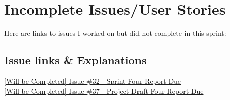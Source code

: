 \documentclass{article}
\begin{document}
\newpage

\section{Incomplete Issues/User Stories}
Here are links to issues I worked on but did not complete in this sprint:
\subsection{Issue links \& Explanations}
\href{https://github.com/zachA214/Adelson_Senior_Capstone/issues/32}{[Will be Completed] Issue \#32 - Sprint Four Report Due} \\
\noindent{}
\href{https://github.com/zachA214/Adelson_Senior_Capstone/issues/37}{[Will be Completed] Issue \#37 - Project Draft Four Report Due} \\
\noindent{}
\end{document}
